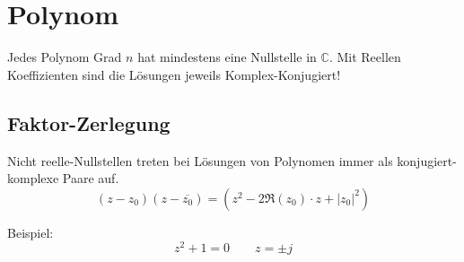 \section{Polynom}
Jedes Polynom Grad $n$ hat mindestens eine Nullstelle in $\mathbb{C}$. Mit Reellen Koeffizienten sind die Lösungen jeweils Komplex-Konjugiert!

\subsection{Faktor-Zerlegung}
Nicht reelle-Nullstellen treten bei Lösungen von Polynomen immer als konjugiert-komplexe Paare auf.
\[
(z - z_0)(z-\overline{z_0}) = (z^2 - 2\Re(z_0)\cdot z + \left|z_0\right|^2)
\]

\noindent Beispiel:
\[z^2 + 1 = 0 \qquad z=\pm j\]